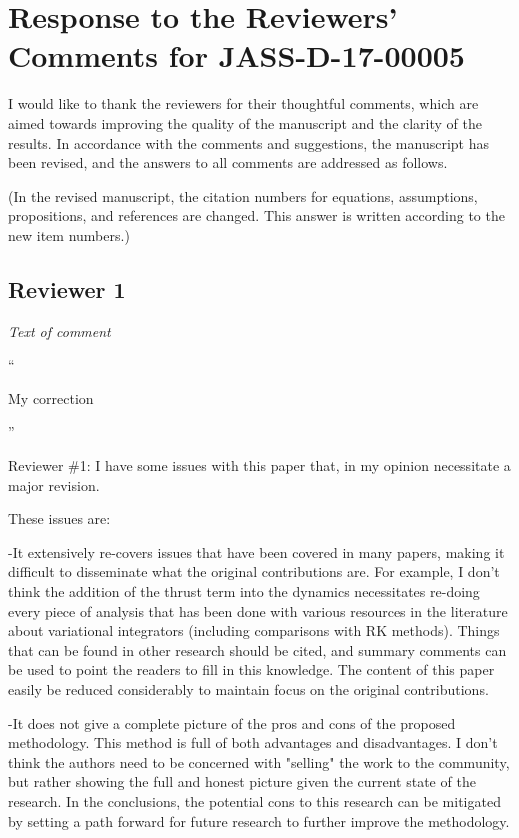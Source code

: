 \documentclass[11pt]{article}
\newenvironment{correction}{\begin{list}{}{\setlength{\leftmargin}{1cm}\setlength{\rightmargin}{1cm}}\vspace{\parsep}\item[]``}{''\end{list}}
\begin{document}

\section*{Response to the Reviewers' Comments for JASS-D-17-00005}

I would like to thank the reviewers for their thoughtful comments, which are aimed towards improving the quality of the manuscript and the clarity of the results. 
In accordance with the comments and suggestions, the manuscript has been revised, and the answers to all comments are addressed as follows.

(In the revised manuscript, the citation numbers for equations, assumptions, propositions, and references are changed. This answer is written according to the new item numbers.)

\subsection*{Reviewer 1} 
\begin{enumerate}
    \item \textit{Text of comment}

        \begin{correction}

            My correction

        \end{correction}
\end{enumerate}
Reviewer \#1: I have some issues with this paper that, in my opinion necessitate a major revision.

These issues are:

-It extensively re-covers issues that have been covered in many papers, making it difficult to disseminate what the original contributions are.  For example, I don't think the addition of the thrust term into the dynamics necessitates re-doing every piece of analysis that has been done with various resources in the literature about variational integrators (including comparisons with RK methods).  Things that can be found in other research should be cited, and summary comments can be used to point the readers to fill in this knowledge.  The content of this paper easily be reduced considerably to maintain focus on the original contributions.

-It does not give a complete picture of the pros and cons of the proposed methodology.  This method is full of both advantages and disadvantages.  I don't think the authors need to be concerned with "selling" the work to the community, but rather showing the full and honest picture given the current state of the research.  In the conclusions, the potential cons to this research can be mitigated by setting a path forward for future research to further improve the methodology.
\end{document}
